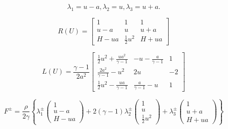 \documentclass[UTF8]{ctexart}
\begin{document}
$$
\lambda_1=u-a,\lambda_2=u,\lambda_3=u+a.
$$

  \begin{equation*}
       R(U)=  \left[ \begin{matrix}
                        1 & 1 & 1 \\
                        u-a & u & u+a \\
                    H-ua & \frac{1}{2}u^2 & H+ua
                      \end{matrix} \right]
  \end{equation*}

  \begin{equation*}
       L(U)=  \frac{\gamma-1}{2a^2}\left[ \begin{matrix}
                        \frac{1}{2}u^2+\frac{ua^2}{\gamma-1} & -u-\frac{a}{\gamma-1} & 1 \\
                        \frac{2a^2}{\gamma-1}-u^2 & 2u & -2 \\
                    \frac{1}{2}u^2-\frac{ua}{\gamma-1} & \frac{a}{\gamma-1}-u & 1
                      \end{matrix} \right]
  \end{equation*}


  \begin{equation*}
       F^{\pm}=  \frac{\rho}{2\gamma} \left\{
       \lambda_1^{\pm} \left( \begin{matrix}
         1 \\
         u-a \\
         H-ua
       \end{matrix} \right)
       +2(\gamma-1)\lambda_2^{\pm} \left( \begin{matrix}
         1 \\
         u \\
         \frac{1}{2}u^2
       \end{matrix} \right)
        +\lambda_3^{\pm} \left( \begin{matrix}
         1 \\
         u+a \\
         H+ua
       \end{matrix} \right)
        \right\}
  \end{equation*}
\end{document}
